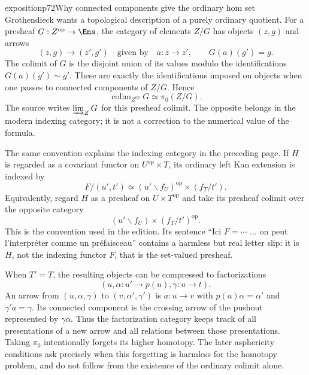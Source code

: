 \begin{dcomment}{exposition}{p72}{Why connected components give the ordinary hom set}
Grothendieck wants a topological description of a purely ordinary quotient. For a presheaf $G:Z^{\mathrm{op}}\to\Ens$, the category of elements $Z/G$ has objects $(z,g)$ and arrows
\[
 (z,g)\longrightarrow(z',g')\quad\text{given by}\quad
 a:z\longrightarrow z',\qquad G(a)(g')=g.
\]
The colimit of $G$ is the disjoint union of its values modulo the identifications $G(a)(g')\sim g'$. These are exactly the identifications imposed on objects when one passes to connected components of $Z/G$. Hence
\[
 \mathop{\mathrm{colim}}_{Z^{\mathrm{op}}}G\simeq\pi_0(Z/G).
\]
The source writes $\varinjlim_Z G$ for this presheaf colimit. The opposite belongs in the modern indexing category; it is not a correction to the numerical value of the formula.

The same convention explains the indexing category in the preceding page. If $H$ is regarded as a covariant functor on $U^{\mathrm{op}}\times T$, its ordinary left Kan extension is indexed by
\[
 F/(u',t')\simeq (u'\backslash f_U)^{\mathrm{op}}\times(f_T/t').
\]
Equivalently, regard $H$ as a presheaf on $U\times T^{\mathrm{op}}$ and take its presheaf colimit over the opposite category
\[
 (u'\backslash f_U)\times(f_T/t')^{\mathrm{op}}.
\]
This is the convention used in the edition. Its sentence ``Ici $F=\cdots$ ... on peut l'interpr\'eter comme un pr\'efaisceau'' contains a harmless but real letter slip: it is $H$, not the indexing functor $F$, that is the set-valued presheaf.

When $T'=T$, the resulting objects can be compressed to factorizations
\[
 (u,\alpha:u'\to p(u),\gamma:u\to t).
\]
An arrow from $(u,\alpha,\gamma)$ to $(v,\alpha',\gamma')$ is $a:u\to v$ with $p(a)\alpha=\alpha'$ and $\gamma'a=\gamma$. Its connected component is the crossing arrow of the pushout represented by $\gamma\alpha$. Thus the factorization category keeps track of all presentations of a new arrow and all relations between those presentations. Taking $\pi_0$ intentionally forgets its higher homotopy. The later asphericity conditions ask precisely when this forgetting is harmless for the homotopy problem, and do not follow from the existence of the ordinary colimit alone.
\end{dcomment}

